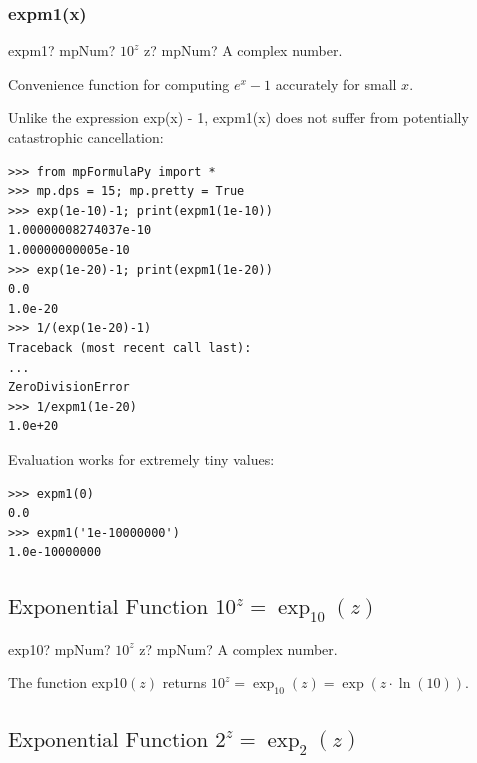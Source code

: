 \subsubsection{expm1(x)}

\begin{mpFunctionsExtract}
	\mpFunctionOne
	{expm1? mpNum?  $10^z$}
	{z? mpNum? A complex number.}
\end{mpFunctionsExtract}


Convenience function for computing $e^{x}-1$ accurately for small $x$. 

Unlike the expression exp(x) - 1, expm1(x) does not suffer from potentially catastrophic
cancellation:

\begin{lstlisting}
>>> from mpFormulaPy import *
>>> mp.dps = 15; mp.pretty = True
>>> exp(1e-10)-1; print(expm1(1e-10))
1.00000008274037e-10
1.00000000005e-10
>>> exp(1e-20)-1; print(expm1(1e-20))
0.0
1.0e-20
>>> 1/(exp(1e-20)-1)
Traceback (most recent call last):
...
ZeroDivisionError
>>> 1/expm1(1e-20)
1.0e+20
\end{lstlisting}


Evaluation works for extremely tiny values:
\begin{lstlisting}
>>> expm1(0)
0.0
>>> expm1('1e-10000000')
1.0e-10000000
\end{lstlisting}





\subsection{\texorpdfstring{$\text{Exponential Function }10^z = \exp_{10}(z)$}{exp10}}

\begin{mpFunctionsExtract}
	\mpFunctionOne
	{exp10? mpNum?  $10^z$}
	{z? mpNum? A complex number.}
\end{mpFunctionsExtract}

\vspace{0.3cm}
The function \textsf{exp10$(z)$} returns $10^z = \exp_{10}(z) = \exp(z \cdot \ln(10))$.




\subsection{\texorpdfstring{$\text{Exponential Function }2^z = \exp_2(z)$}{exp2}}

